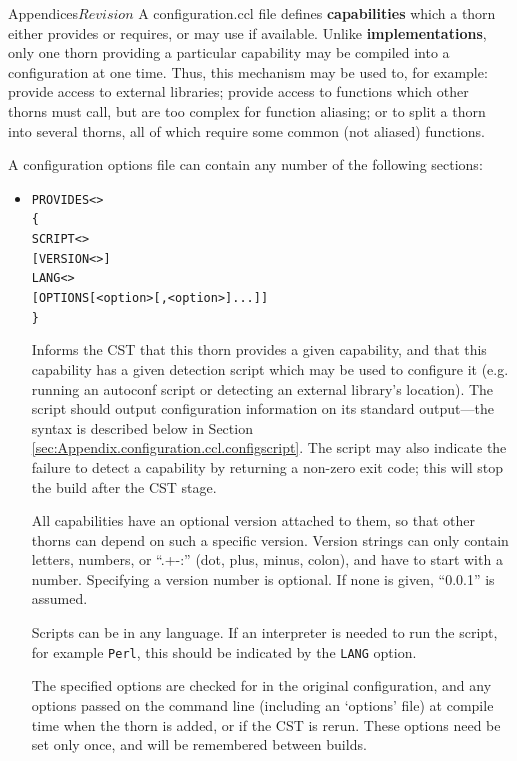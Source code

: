 \begin{cactuspart}{Appendices}{}{$Revision$}
A configuration.ccl file defines {\bf capabilities} which a thorn
either provides or requires, or may use if available.  Unlike {\bf
implementations}, only one thorn providing a particular capability may
be compiled into a configuration at one time.  Thus, this mechanism may
be used to, for example: provide access to external libraries; provide
access to functions which other thorns must call, but are too complex
for function aliasing; or to split a thorn into several thorns, all of
which require some common (not aliased) functions.

A configuration options file can contain any number of the following
sections:

\begin{itemize}

\item

\begin{alltt}
PROVIDES <>
\{
  SCRIPT <>
  [VERSION <>]
  LANG <>
  [OPTIONS [<option>[,<option>]...]]
\}
\end{alltt}

Informs the CST that this thorn provides a given capability, and that
this capability has a given detection script which may be used to
configure it (e.g. running an autoconf script or detecting an external
library's location).  The script should output configuration
information on its standard output---the syntax is described below
in Section \ref{sec:Appendix.configuration.ccl.configscript}.  The
script may also indicate the failure to detect a capability by
returning a non-zero exit code;  this will stop the build after the
CST stage.

All capabilities have an optional version attached to them, so that other
thorns can depend on such a specific version. Version strings can only contain
letters, numbers, or ``.+-:'' (dot, plus, minus, colon), and have to start with
a number. Specifying a version number is optional. If none is given, ``0.0.1''
is assumed.

Scripts can be in any language.  If an interpreter is needed to run
the script, for example \verb|Perl|, this should be indicated by the
\verb|LANG| option.

The specified options are checked for in the original configuration,
and any options passed on the command line (including an `options'
file) at compile time when the thorn is added, or if the CST is
rerun.  These options need be set only once, and will be remembered
between builds.


\end{itemize}
\end{cactuspart}
